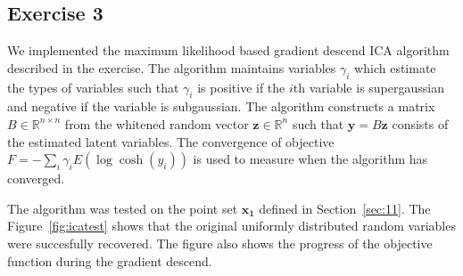 \documentclass{article}
\renewcommand\vec[1]{\ensuremath{\mathbf{#1}}}
\begin{document}
\subsection{Exercise 3}
We implemented the maximum likelihood based gradient descend ICA algorithm described in the exercise.
The algorithm maintains variables $\gamma_i$ which estimate the types of variables such that $\gamma_i$ is positive if the $i$th variable is supergaussian and negative if the variable is subgaussian.
The algorithm constructs a matrix $B\in\mathbb{R}^{n\times n}$ from the whitened random vector $\vec z\in\mathbb{R}^n$ such that $\vec y=B\vec z$ consists of the estimated latent variables.
The convergence of objective $F=-\sum_i\gamma_iE(\log\cosh(y_i))$ is used to measure when the algorithm has converged.

The algorithm was tested on the point set \vec{x_1} defined in Section~\ref{sec:11}.
The Figure~\ref{fig:icatest} shows that the original uniformly distributed random variables were succesfully recovered.
The figure also shows the progress of the objective function during the gradient descend.
\end{document}

